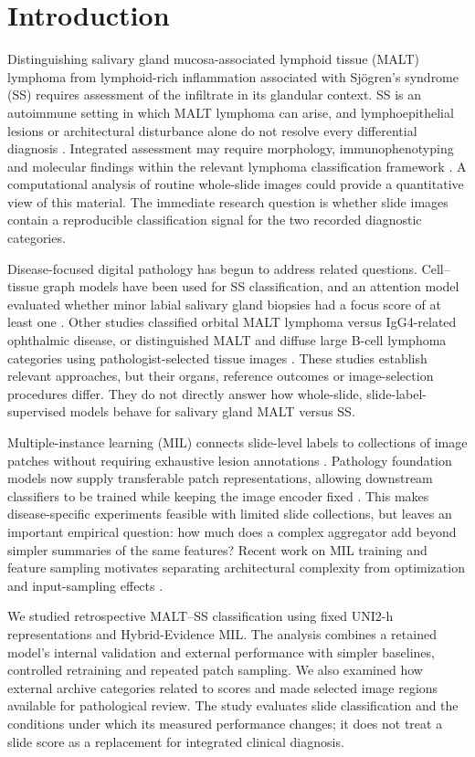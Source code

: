 \section{Introduction}
Distinguishing salivary gland mucosa-associated lymphoid tissue (MALT) lymphoma from lymphoid-rich inflammation associated with Sjögren's syndrome (SS) requires assessment of the infiltrate in its glandular context. SS is an autoimmune setting in which MALT lymphoma can arise, and lymphoepithelial lesions or architectural disturbance alone do not resolve every differential diagnosis \citep{ref1,ref2}. Integrated assessment may require morphology, immunophenotyping and molecular findings within the relevant lymphoma classification framework \citep{ref3,ref4}. A computational analysis of routine whole-slide images could provide a quantitative view of this material. The immediate research question is whether slide images contain a reproducible classification signal for the two recorded diagnostic categories.

Disease-focused digital pathology has begun to address related questions. Cell--tissue graph models have been used for SS classification, and an attention model evaluated whether minor labial salivary gland biopsies had a focus score of at least one \citep{ref10,focus2025}. Other studies classified orbital MALT lymphoma versus IgG4-related ophthalmic disease, or distinguished MALT and diffuse large B-cell lymphoma categories using pathologist-selected tissue images \citep{ref11,lymphoma2025}. These studies establish relevant approaches, but their organs, reference outcomes or image-selection procedures differ. They do not directly answer how whole-slide, slide-label-supervised models behave for salivary gland MALT versus SS.

Multiple-instance learning (MIL) connects slide-level labels to collections of image patches without requiring exhaustive lesion annotations \citep{ref5,ref6,ref7}. Pathology foundation models now supply transferable patch representations, allowing downstream classifiers to be trained while keeping the image encoder fixed \citep{ref8,ref9}. This makes disease-specific experiments feasible with limited slide collections, but leaves an important empirical question: how much does a complex aggregator add beyond simpler summaries of the same features? Recent work on MIL training and feature sampling motivates separating architectural complexity from optimization and input-sampling effects \citep{nnmil2026}.

We studied retrospective MALT--SS classification using fixed UNI2-h representations and Hybrid-Evidence MIL. The analysis combines a retained model's internal validation and external performance with simpler baselines, controlled retraining and repeated patch sampling. We also examined how external archive categories related to scores and made selected image regions available for pathological review. The study evaluates slide classification and the conditions under which its measured performance changes; it does not treat a slide score as a replacement for integrated clinical diagnosis.
